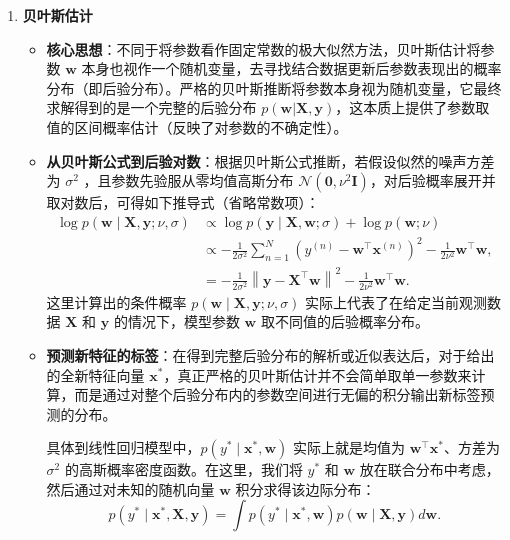 \documentclass{article}
\theoremstyle{remark}
\theoremstyle{definition}
\theoremstyle{plain}
\numberwithin {equation}{section}
\numberwithin{assumption}{section}
\begin{document}
\begin{enumerate}
    \item \textbf{贝叶斯估计}
    \begin{itemize}
        \item \textbf{核心思想}：不同于将参数看作固定常数的极大似然方法，贝叶斯估计将参数 $\boldsymbol{w}$ 本身也视作一个随机变量，去寻找结合数据更新后参数表现出的概率分布（即后验分布）。严格的贝叶斯推断将参数本身视为随机变量，它最终求解得到的是一个完整的后验分布 $p(\boldsymbol{w}|\boldsymbol{X}, \boldsymbol{y})$，这本质上提供了参数取值的区间概率估计（反映了对参数的不确定性）。
        \item \textbf{从贝叶斯公式到后验对数}：根据贝叶斯公式推断，若假设似然的噪声方差为 $\sigma^2$ ，且参数先验服从零均值高斯分布 $\mathcal{N}(\boldsymbol{0}, \nu^2\boldsymbol{I})$，对后验概率展开并取对数后，可得如下推导式（省略常数项）：
        \begin{align*}
        \log p(\boldsymbol{w} \mid \boldsymbol{X}, \boldsymbol{y} ; \nu, \sigma) & \propto \log p(\boldsymbol{y} \mid \boldsymbol{X}, \boldsymbol{w} ; \sigma)+\log p(\boldsymbol{w} ; \nu) \\
        & \propto-\frac{1}{2 \sigma^2} \sum_{n=1}^N\left(y^{(n)}-\boldsymbol{w}^{\top} \boldsymbol{x}^{(n)}\right)^2-\frac{1}{2 \nu^2} \boldsymbol{w}^{\top} \boldsymbol{w}, \\
        & =-\frac{1}{2 \sigma^2}\left\|\boldsymbol{y}-\boldsymbol{X}^{\top} \boldsymbol{w}\right\|^2-\frac{1}{2 \nu^2} \boldsymbol{w}^{\top} \boldsymbol{w} .
        \end{align*}
        这里计算出的条件概率 $p(\boldsymbol{w} \mid \boldsymbol{X}, \boldsymbol{y} ; \nu, \sigma)$ 实际上代表了在给定当前观测数据 $\boldsymbol{X}$ 和 $\boldsymbol{y}$ 的情况下，模型参数 $\boldsymbol{w}$ 取不同值的后验概率分布。
        \item \textbf{预测新特征的标签}：在得到完整后验分布的解析或近似表达后，对于给出的全新特征向量 $\boldsymbol{x}^*$，真正严格的贝叶斯估计并不会简单取单一参数来计算，而是通过对整个后验分布内的参数空间进行无偏的积分输出新标签预测的分布。

        具体到线性回归模型中，$p(y^* \mid \boldsymbol{x}^*, \boldsymbol{w})$ 实际上就是均值为 $\boldsymbol{w}^\top \boldsymbol{x}^*$、方差为 $\sigma^2$ 的高斯概率密度函数。在这里，我们将 $y^*$ 和 $\boldsymbol{w}$ 放在联合分布中考虑，然后通过对未知的随机向量 $\boldsymbol{w}$ 积分求得该边际分布：
        \begin{equation*}
        p(y^* \mid \boldsymbol{x}^*, \boldsymbol{X}, \boldsymbol{y}) = \int p(y^* \mid \boldsymbol{x}^*, \boldsymbol{w}) p(\boldsymbol{w} \mid \boldsymbol{X}, \boldsymbol{y}) d\boldsymbol{w}
        .
        \end{equation*}
    \end{itemize}


\end{enumerate}
\end{document}
